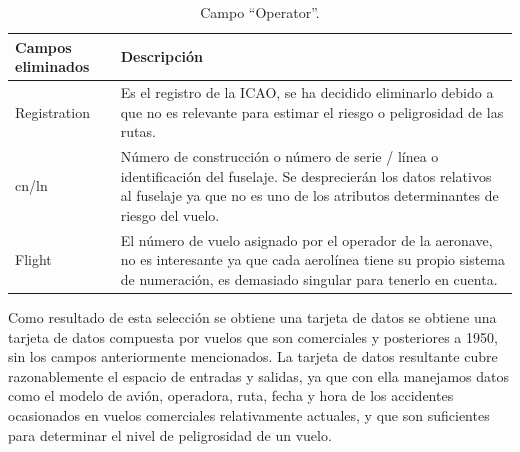 \documentclass[a4paper,10pt]{article}
\begin{document}
\singlespacing
\begin{table}[htbp]
\centering
\begin{tabular}{p{4cm} p{8cm}}
\hline \hline
Campos eliminados & Descripci\'on\\
\hline \hline
Registration & Es el registro de la ICAO, se ha decidido eliminarlo debido a que no es relevante para estimar el riesgo o peligrosidad de las rutas.\\
\hline
cn/ln & N\'umero de construcci\'on o n\'umero de serie / l\'inea o identificaci\'on del fuselaje. Se desprecier\'an los datos relativos al fuselaje ya que no es uno de los atributos determinantes de riesgo del vuelo.\\
\hline
Flight & El n\'umero de vuelo asignado por el operador de la aeronave, no es interesante ya que cada aerol\'inea tiene su propio sistema de numeraci\'on, es demasiado singular para tenerlo en cuenta.\\
\hline \hline

\end{tabular}
\caption{Campo ``Operator''.}
\label{tabla:autores}
\end{table}

    \singlespacing
	Como resultado de esta selecci\'on se obtiene una tarjeta de datos se obtiene una tarjeta de datos compuesta por vuelos que son comerciales y posteriores a 1950, sin los campos anteriormente mencionados.
    \singlespacing
	La tarjeta de datos resultante cubre razonablemente el espacio de entradas y salidas, ya que con ella manejamos datos como el modelo de avi\'on, operadora, ruta, fecha y hora de los accidentes ocasionados en vuelos comerciales relativamente actuales, y que son suficientes para determinar el nivel de peligrosidad de un vuelo.
\end{document}
